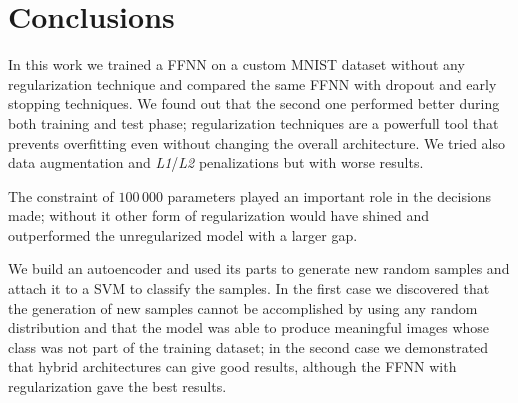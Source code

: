 \documentclass[compsoc]{IEEEtran}
\begin{document}
\section{Conclusions}
In this work we trained a FFNN on a custom MNIST dataset without any regularization technique and compared the same FFNN with dropout and early stopping techniques. We found out that the second one performed better during both training and test phase; regularization techniques are a powerfull tool that
prevents overfitting even without changing the overall architecture. We tried also data augmentation and \emph{L1}/\emph{L2} penalizations but with worse results. \par
The constraint of $100\,000$ parameters played an important role in the decisions made; without it other form of regularization would have shined and outperformed the unregularized model with a larger gap. \par 
We build an autoencoder and used its parts to generate new random samples and attach it to a SVM to classify the samples. 
In the first case we discovered that the generation of new samples cannot be accomplished by using any random distribution and that the model was able to produce meaningful images whose class was not part of the training dataset; in the second case we demonstrated that hybrid architectures can give good results, although the FFNN with regularization gave the best results. 
\end{document}
